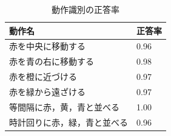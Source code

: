 \begin{table}[h]
	\caption{動作識別の正答率}
	\label{table:result}
	\centering
  	\begin{tabular}{|l|l|} \hline
    	動作名 & 正答率\\ \hline
   	赤を中央に移動する 		& 0.96
    	\\
    	赤を青の右に移動する 		& 0.98
    	\\
    	赤を橙に近づける 			& 0.97
    	\\
    	赤を緑から遠ざける 			& 0.97
    	\\
    	等間隔に赤，黄，青と並べる 	& 1.00
    	\\
    	時計回りに赤，緑，青と並べる 	& 0.96
    	\\ \hline
  	\end{tabular}
\end{table}

